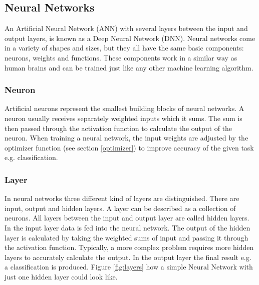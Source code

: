 \subsection{Neural Networks}

An Artificial Neural Network (ANN) with several layers between the input and output layers, is known as a Deep Neural Network (DNN). Neural networks come in a variety of shapes and sizes, but they all have the same basic components: neurons, weights and functions. These components work in a similar way as human brains and can be trained just like any other machine learning algorithm.

\subsubsection{Neuron}
Artificial neurons represent the smallest building blocks of neural networks. A neuron usually receives separately weighted inputs which it sums. The sum is then passed through the activation function to calculate the output of the neuron. When training a neural network, the input weights are adjusted by the optimizer function (see section \ref{optimizer}) to improve accuracy of the given task e.g. classification.

\subsubsection{Layer}
In neural networks three different kind of layers are distinguished. There are input, output and hidden layers. A layer can be described as a collection of neurons. All layers between the input and output layer are called hidden layers. In the input layer data is fed into the neural network. The output of the hidden layer is calculated by taking the weighted sums of input and passing it through the activation function. Typically, a more complex problem requires more hidden layers to accurately calculate the output. In the output layer the final result e.g. a classification is produced. Figure \ref{fig:layers} how a simple Neural Network with just one hidden layer could look like.


